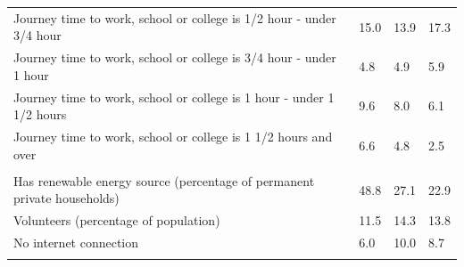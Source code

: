 \documentclass{article}
\begin{document}
\begin{table}[h]
\begin{tabular}{KTTT}
Journey time to work, school or college is 1/2 hour - under 3/4 hour & 15.0& 13.9& 17.3\\
Journey time to work, school or college is 3/4 hour - under 1 hour & 4.8& 4.9& 5.9\\
Journey time to work, school or college is 1 hour - under 1 1/2 hours & 9.6& 8.0& 6.1\\
Journey time to work, school or college is 1 1/2 hours and over & 6.6& 4.8& 2.5\\
\hline
    \\ 
    \hline
Has renewable energy source (percentage of permanent private households) & 48.8& 27.1& 22.9\\
    \hline
Volunteers (percentage of population) & 11.5& 14.3& 13.8\\
    \hline
No internet connection&  6.0& 10.0&  8.7\\
\hline
\end{tabular}
\end{table}
\end{document}
